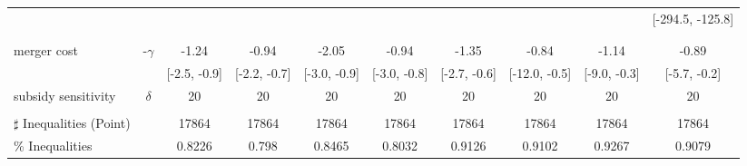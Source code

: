 \begin{tabular}{@{\extracolsep{5pt}}lccccccccc}
 &  &  &  &  &  &  &  &  & [-294.5, -125.8] \\
 &  &  &  &  &  &  &  &  &  \\
 &  &  &  &  &  &  &  &  &  \\
merger cost & -$\gamma$ & -1.24 & -0.94 & -2.05 & -0.94 & -1.35 & -0.84 & -1.14 & -0.89 \\
 &  & [-2.5, -0.9] & [-2.2, -0.7] & [-3.0, -0.9] & [-3.0, -0.8] & [-2.7, -0.6] & [-12.0, -0.5] & [-9.0, -0.3] & [-5.7, -0.2] \\
subsidy sensitivity & $\delta$ & 20 & 20 & 20 & 20 & 20 & 20 & 20 & 20 \\
 &  &  &  &  &  &  &  &  &  \\
\hline 
$\sharp$ Inequalities (Point) &  & 17864 & 17864 & 17864 & 17864 & 17864 & 17864 & 17864 & 17864 \\
\% Inequalities &  & 0.8226 & 0.798 & 0.8465 & 0.8032 & 0.9126 & 0.9102 & 0.9267 & 0.9079 \\
\bottomrule 
\end{tabular}

